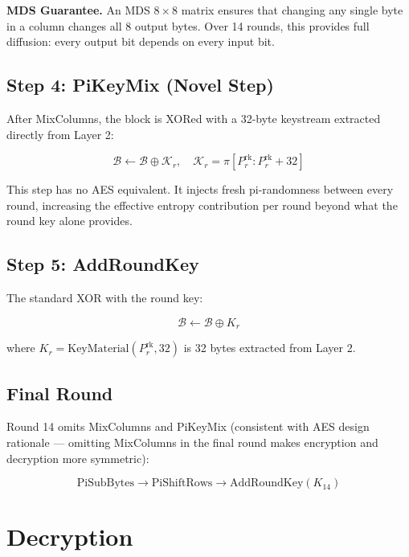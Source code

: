 \documentclass[12pt, a4paper]{article}
\newcommand{\keystream}{\mathcal{K}}
\newcommand{\block}{\mathcal{B}}
\begin{document}
\begin{highlight}
\textbf{MDS Guarantee.} An MDS $8 \times 8$ matrix ensures that changing any single byte in a column changes all 8 output bytes. Over 14 rounds, this provides full diffusion: every output bit depends on every input bit.
\end{highlight}

\subsection{Step 4: PiKeyMix (Novel Step)}

After MixColumns, the block is XORed with a 32-byte keystream extracted directly from Layer 2:

\begin{equation}
  \block \leftarrow \block \oplus \keystream_r, \quad \keystream_r = \pi[P^{\text{rk}}_r : P^{\text{rk}}_r + 32]
\end{equation}

This step has no AES equivalent. It injects fresh pi-randomness between every round, increasing the effective entropy contribution per round beyond what the round key alone provides.

\subsection{Step 5: AddRoundKey}

The standard XOR with the round key:

\begin{equation}
  \block \leftarrow \block \oplus K_r
\end{equation}

where $K_r = \text{KeyMaterial}(P^{\text{rk}}_r, 32)$ is 32 bytes extracted from Layer 2.

\subsection{Final Round}

Round 14 omits MixColumns and PiKeyMix (consistent with AES design rationale — omitting MixColumns in the final round makes encryption and decryption more symmetric):

\[
\text{PiSubBytes} \to \text{PiShiftRows} \to \text{AddRoundKey}(K_{14})
\]

\section{Decryption}
\end{document}
